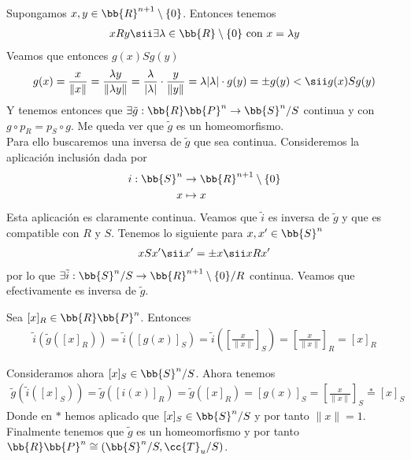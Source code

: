 \begin{ejemplo}
\begin{itemize}
        Supongamos $x,y\in \bb{R}^{n+1}\setminus \{0\}$. Entonces tenemos
        \begin{align*}
            xRy \sii \exists \lambda \in \bb{R}\setminus \{0\} \text{ con } x=\lambda y
        \end{align*}
        Veamos que entonces $g(x)Sg(y)$
        \begin{align*}
            g(x)=\frac{x}{\|x\|} = \frac{\lambda y}{\|\lambda y\|} = \frac{\lambda}{|\lambda|} \cdot \frac{y}{\|y\|} = {\lambda}{|\lambda|} \cdot g(y) = \pm g(y) <\sii g(x)Sg(y)
        \end{align*}
        Y tenemos entonces que $\exists \tilde{g}:\bb{R}\bb{P}^n \to \bb{S}^n/S$ continua y con $g \circ p_R=p_S \circ g$. Me queda ver que $\tilde{g}$ es un homeomorfismo.\\
        Para ello buscaremos una inversa de $\tilde{g}$ que sea continua. Consideremos la aplicación inclusión dada por
        \begin{align*}
            i:\bb{S}^n & \to \bb{R}^{n+1}\setminus \{0\}\\
            x & \mapsto x
        \end{align*}
        Esta aplicación es claramente continua. Veamos que $\tilde{i}$ es inversa de $\tilde{g}$ y que es compatible con $R$ y $S$. Tenemos lo siguiente para $x,x'\in \bb{S}^n$
        \begin{align*}
            xSx' \sii x'=\pm x \sii xRx'
        \end{align*}
        por lo que $\exists \tilde{i}:\bb{S}^n/S \to \bb{R}^{n+1}\setminus \{0\}/R$ continua. Veamos que efectivamente es inversa de $\tilde{g}$.

        Sea $[x]_R\in \bb{R}\bb{P}^n$. Entonces
        \begin{align*}
            \tilde{i}(\tilde{g}([x]_R)) = \tilde{i}([g(x)]_S) = \tilde{i}\left(\left[\frac{x}{\|x\|}\right]_S\right) = \left[\frac{x}{\|x\|}\right]_R = [x]_R
        \end{align*}

        Consideramos ahora $[x]_S\in \bb{S}^n/S$. Ahora tenemos
        \begin{align*}
            \tilde{g}(\tilde{i}([x]_S)) = \tilde{g}([i(x)]_R) = \tilde{g}([x]_R) = \left[g(x)\right]_S= \left[\frac{x}{\|x\|}\right]_S \overset{\ast}{=}[x]_S
        \end{align*}
        Donde en $\ast$ hemos aplicado que $[x]_S \in \bb{S}^n/S$ y por tanto $\|x\|=1$.\\
        Finalmente tenemos que $\tilde{g}$ es un homeomorfismo y por tanto 
        $\bb{R}\bb{P}^n \cong (\bb{S}^n/S, \cc{T}_u/S)$.


\end{itemize}
\end{ejemplo}
